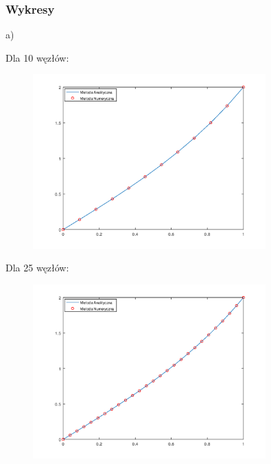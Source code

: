 \begin{samepage}
    
\end{samepage}

\newpage
\subsubsection{Wykresy}

a)\\
\begin{samepage}
Dla 10 węzłów:

\FloatBarrier
\begin{figure}[!ht]
    \begin{center}
        \includegraphics[width=0.8\textwidth]{Lab4/charts/zad1/zad1_n_10.png}
    \end{center}
\end{figure}
\FloatBarrier
\end{samepage}

\begin{samepage}
Dla 25 węzłów:
\begin{figure}[!ht]
    \begin{center}
\includegraphics[width=0.8\textwidth]{Lab4/charts/zad1/zad1_n_25.png}
    \end{center}
\end{figure}
\FloatBarrier
\end{samepage}

